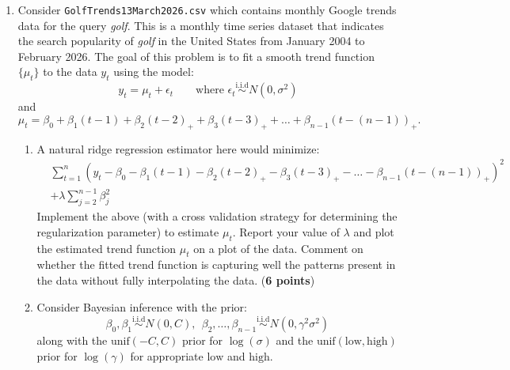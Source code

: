 \documentclass{scrartcl}
\def\qt#1{\qquad\text{#1}}
\begin{document}
\begin{enumerate}
\item Consider \texttt{GolfTrends13March2026.csv} which contains
  monthly Google trends data for the query \textit{golf}. This is a
  monthly time series dataset that indicates the search popularity of
  \textit{golf} in the United States from January 2004 to February
  2026. The goal of this problem is to fit a smooth trend 
 function $\{\mu_t\}$ to the data $y_t$ using the model:
 \begin{equation*}
   y_t = \mu_t + \epsilon_t \qt{where $\epsilon_t
     \overset{\text{i.i.d}}{\sim} N(0, \sigma^2)$} 
 \end{equation*}
 and
 \begin{equation*}
   \mu_t = \beta_0 + \beta_1 (t-1) + \beta_2 (t - 2)_+ + \beta_3 (t -
   3)_+ + \dots + \beta_{n-1}(t - (n-1))_+. 
 \end{equation*}
 \begin{enumerate}
 \item A natural ridge regression estimator here would minimize:
\begin{equation*}
  \begin{split}
   & \sum_{t=1}^n \left(y_t  - \beta_0 - \beta_1 (t-1) - \beta_2 (t -
     2)_+ - \beta_3 (t - 3)_+ - \dots - \beta_{n-1}(t - (n-1))_+
     \right)^2 \\ &+ \lambda
      \sum_{j=2}^{n-1} \beta_j^2
  \end{split}
\end{equation*}  
  Implement the above (with a cross validation strategy for
   determining the regularization parameter) to estimate
   $\mu_t$. Report your value of $\lambda$ and plot the estimated
   trend function $\hat{\mu}_t$ on a plot of the data. Comment
   on whether the fitted trend function is capturing well the patterns
   present in the data without fully interpolating the
   data. (\textbf{6 points}) 
 \item Consider Bayesian inference with the prior:
   \begin{equation*}
     \beta_0, \beta_1\overset{\text{i.i.d}}{\sim} N(0, C), ~~ \beta_2,
     \dots, \beta_{n-1} 
     \overset{\text{i.i.d}}{\sim} N(0, \gamma^2 \sigma^2) 
   \end{equation*}
   along with the $\text{unif}(-C, C)$ prior for $\log(\sigma)$ and the
   $\text{unif}(\text{low}, \text{high})$ prior for $\log(\gamma)$ for
   appropriate $\text{low}$ and $\text{high}$. 


\end{enumerate}
\end{enumerate}
\end{document}

